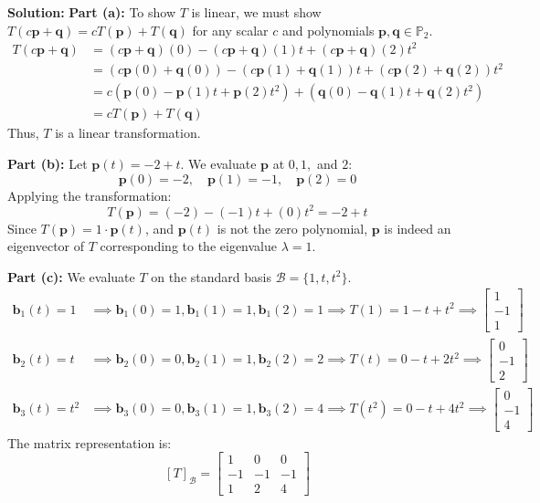 \documentclass[11pt, a4paper]{article}
\theoremstyle{definition}
\theoremstyle{remark}
\begin{document}
\textbf{Solution:}
\textbf{Part (a):} To show $T$ is linear, we must show $T(c\mathbf{p} + \mathbf{q}) = cT(\mathbf{p}) + T(\mathbf{q})$ for any scalar $c$ and polynomials $\mathbf{p}, \mathbf{q} \in \mathbb{P}_2$.
\begin{align*}
    T(c\mathbf{p} + \mathbf{q}) &= (c\mathbf{p} + \mathbf{q})(0) - (c\mathbf{p} + \mathbf{q})(1)t + (c\mathbf{p} + \mathbf{q})(2)t^2 \\
    &= (c\mathbf{p}(0) + \mathbf{q}(0)) - (c\mathbf{p}(1) + \mathbf{q}(1))t + (c\mathbf{p}(2) + \mathbf{q}(2))t^2 \\
    &= c\left( \mathbf{p}(0) - \mathbf{p}(1)t + \mathbf{p}(2)t^2 \right) + \left( \mathbf{q}(0) - \mathbf{q}(1)t + \mathbf{q}(2)t^2 \right) \\
    &= cT(\mathbf{p}) + T(\mathbf{q})
\end{align*}
Thus, $T$ is a linear transformation.

\textbf{Part (b):} Let $\mathbf{p}(t) = -2 + t$. We evaluate $\mathbf{p}$ at $0, 1,$ and $2$:
\[
\mathbf{p}(0) = -2, \quad \mathbf{p}(1) = -1, \quad \mathbf{p}(2) = 0
\]
Applying the transformation:
\[
T(\mathbf{p}) = (-2) - (-1)t + (0)t^2 = -2 + t
\]
Since $T(\mathbf{p}) = 1 \cdot \mathbf{p}(t)$, and $\mathbf{p}(t)$ is not the zero polynomial, $\mathbf{p}$ is indeed an eigenvector of $T$ corresponding to the eigenvalue $\lambda = 1$.

\textbf{Part (c):} We evaluate $T$ on the standard basis $\mathcal{B} = \{1, t, t^2\}$.
\begin{align*}
    \mathbf{b}_1(t) = 1 &\implies \mathbf{b}_1(0)=1, \mathbf{b}_1(1)=1, \mathbf{b}_1(2)=1 \implies T(1) = 1 - t + t^2 \implies \begin{bmatrix} 1 \\ -1 \\ 1 \end{bmatrix} \\
    \mathbf{b}_2(t) = t &\implies \mathbf{b}_2(0)=0, \mathbf{b}_2(1)=1, \mathbf{b}_2(2)=2 \implies T(t) = 0 - t + 2t^2 \implies \begin{bmatrix} 0 \\ -1 \\ 2 \end{bmatrix} \\
    \mathbf{b}_3(t) = t^2 &\implies \mathbf{b}_3(0)=0, \mathbf{b}_3(1)=1, \mathbf{b}_3(2)=4 \implies T(t^2) = 0 - t + 4t^2 \implies \begin{bmatrix} 0 \\ -1 \\ 4 \end{bmatrix}
\end{align*}
The matrix representation is:
\[
[T]_\mathcal{B} = \begin{bmatrix} 1 & 0 & 0 \\ -1 & -1 & -1 \\ 1 & 2 & 4 \end{bmatrix}
\]
\end{document}
